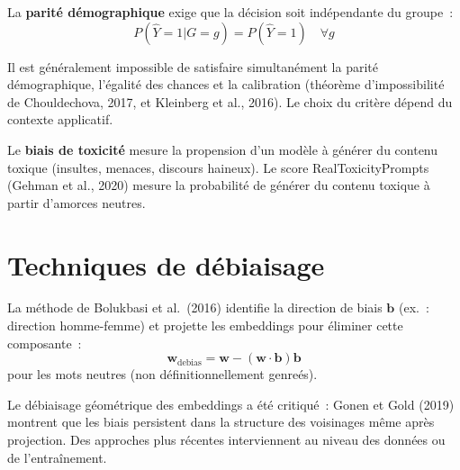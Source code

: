 \begin{definition}
La \textbf{parit\'e d\'emographique} exige que la d\'ecision soit
ind\'ependante du groupe~:
\[
    P(\hat{Y} = 1 | G = g) = P(\hat{Y} = 1) \quad \forall g
\]
\end{definition}

\begin{attention}[title=\textbf{Incompatibilit\'e des crit\`eres}]
Il est g\'en\'eralement impossible de satisfaire simultan\'ement
la parit\'e d\'emographique, l'\'egalit\'e des chances et la calibration
(th\'eor\`eme d'impossibilit\'e de Chouldechova, 2017, et Kleinberg
et al., 2016). Le choix du crit\`ere d\'epend du contexte applicatif.
\end{attention}

\begin{definition}
Le \textbf{biais de toxicit\'e} mesure la propension d'un mod\`ele \`a
g\'en\'erer du contenu toxique (insultes, menaces, discours haineux).
Le score RealToxicityPrompts (Gehman et al., 2020) mesure la probabilit\'e
de g\'en\'erer du contenu toxique \`a partir d'amorces neutres.
\end{definition}

\section{Techniques de d\'ebiaisage}
\label{sec:ethique:debiaisage}

\begin{definition}
La m\'ethode de Bolukbasi et al.\ (2016) identifie la direction de
biais $\mathbf{b}$ (ex.~: direction homme-femme) et projette les
embeddings pour \'eliminer cette composante~:
\[
    \mathbf{w}_{\text{debias}} = \mathbf{w} -
    (\mathbf{w} \cdot \mathbf{b}) \mathbf{b}
\]
pour les mots neutres (non d\'efinitionnellement genre\'es).
\end{definition}

\begin{remarque}
Le d\'ebiaisage g\'eom\'etrique des embeddings a \'et\'e critiqu\'e~:
Gonen et Gold (2019) montrent que les biais persistent dans la structure
des voisinages m\^eme apr\`es projection. Des approches plus r\'ecentes
interviennent au niveau des donn\'ees ou de l'entra\^inement.
\end{remarque}

